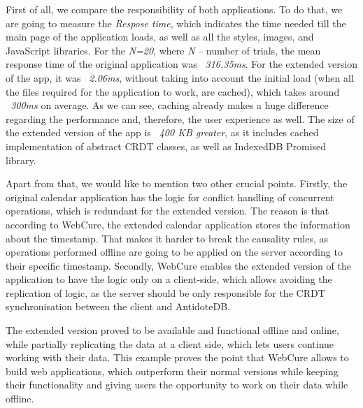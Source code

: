 First of all, we compare the responsibility of both applications. To do that, we are going to measure the \textit{Respose time}, which indicates the time needed till the main page of the application loads, as well as all the styles, images, and JavaScript libraries. For the \textit{N=20}, where \textit{N} -- number of trials, the mean response time of the original application was \textit{~316.35ms}. For the extended version of the app, it was \textit{~2.06ms}, without taking into account the initial load (when all the files required for the application to work, are cached), which takes around \textit{~300ms} on average. As we can see, caching already makes a huge difference regarding the performance and, therefore, the user experience as well. The size of the extended version of the app is \textit{~400 KB greater}, as it includes cached implementation of abstract CRDT classes, as well as IndexedDB Promised library.

Apart from that, we would like to mention two other crucial points. Firstly, the original calendar application has the logic for conflict handling of concurrent operations, which is redundant for the extended version. The reason is that according to WebCure, the extended calendar application stores the information about the timestamp. That makes it harder to break the causality rules, as operations performed offline are going to be applied on the server according to their specific timestamp. Secondly, WebCure enables the extended version of the application to have the logic only on a client-side, which allows avoiding the replication of logic, as the server should be only responsible for the CRDT synchronisation between the client and AntidoteDB.

The extended version proved to be available and functional offline and online, while partially replicating the data at a client side, which lets users continue working with their data. This example proves the point that WebCure allows to build web applications, which outperform their normal versions while keeping their functionality and giving users the opportunity to work on their data while offline.